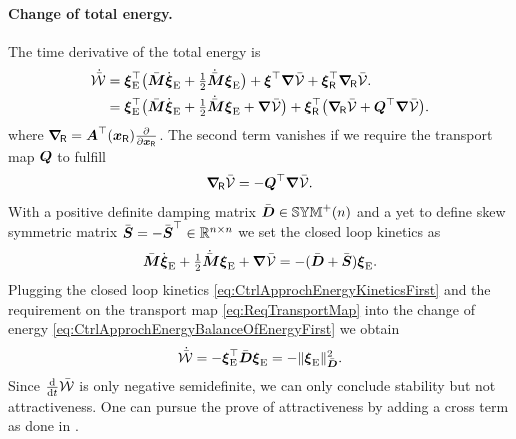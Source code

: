 \paragraph{Change of total energy.}
The time derivative of the total energy is
\begin{align}
 \totalEnergyCd &= \sysVelE^\top \big( \sysInertiaMatC \sysVelEd + \tfrac{1}{2}\sysInertiaMatCd \sysVelE \big) + \sysVel^\top \differential\potentialEnergyC + \sysVelR^\top \differentialR\potentialEnergyC.
\nonumber\\
\label{eq:CtrlApprochEnergyBalanceOfEnergyFirst}
 &= \sysVelE^\top \big( \sysInertiaMatC \sysVelEd + \tfrac{1}{2}\sysInertiaMatCd \sysVelE + \differential\potentialEnergyC \big) + \sysVelR^\top \big( \differentialR\potentialEnergyC + \sysTransportMap^\top \differential\potentialEnergyC \big).
\end{align}
where $\differentialR = \kinMat^\top(\sysCoordR) \tpdiff{\sysCoordR}$.
The second term vanishes if we require the transport map $\sysTransportMap$ to fulfill 
\begin{align}\label{eq:ReqTransportMap}
 \differentialR\potentialEnergyC = -\sysTransportMap^\top \differential\potentialEnergyC.
\end{align}
With a positive definite damping matrix $\sysDissMatC \in \SymMatP(\dimConfigSpace)$ and a yet to define skew symmetric matrix $\accCtrl{\mat{S}} = -\accCtrl{\mat{S}}^\top \in \RealNum^{\dimConfigSpace\times\dimConfigSpace}$ we set the closed loop kinetics as
\begin{align}\label{eq:CtrlApprochEnergyKineticsFirst}
 \sysInertiaMatC \sysVelEd + \tfrac{1}{2}\sysInertiaMatCd \sysVelE + \differential\potentialEnergyC = -(\sysDissMatC + \accCtrl{\mat{S}})\sysVelE.
\end{align}
Plugging the closed loop kinetics \eqref{eq:CtrlApprochEnergyKineticsFirst} and the requirement on the transport map \eqref{eq:ReqTransportMap} into the change of energy \eqref{eq:CtrlApprochEnergyBalanceOfEnergyFirst} we obtain
\begin{align}
 \totalEnergyCd = -\sysVelE^\top \sysDissMatC \sysVelE = -\norm[\sysDissMatC]{\sysVelE}^2.
\end{align}
Since $\tdiff{t} \totalEnergyC$ is only negative semidefinite, we can only conclude stability but not attractiveness.
One can pursue the prove of attractiveness by adding a cross term as done in \cite[sec.\ 4.2]{Bullo:TrackingAutomatica}.


